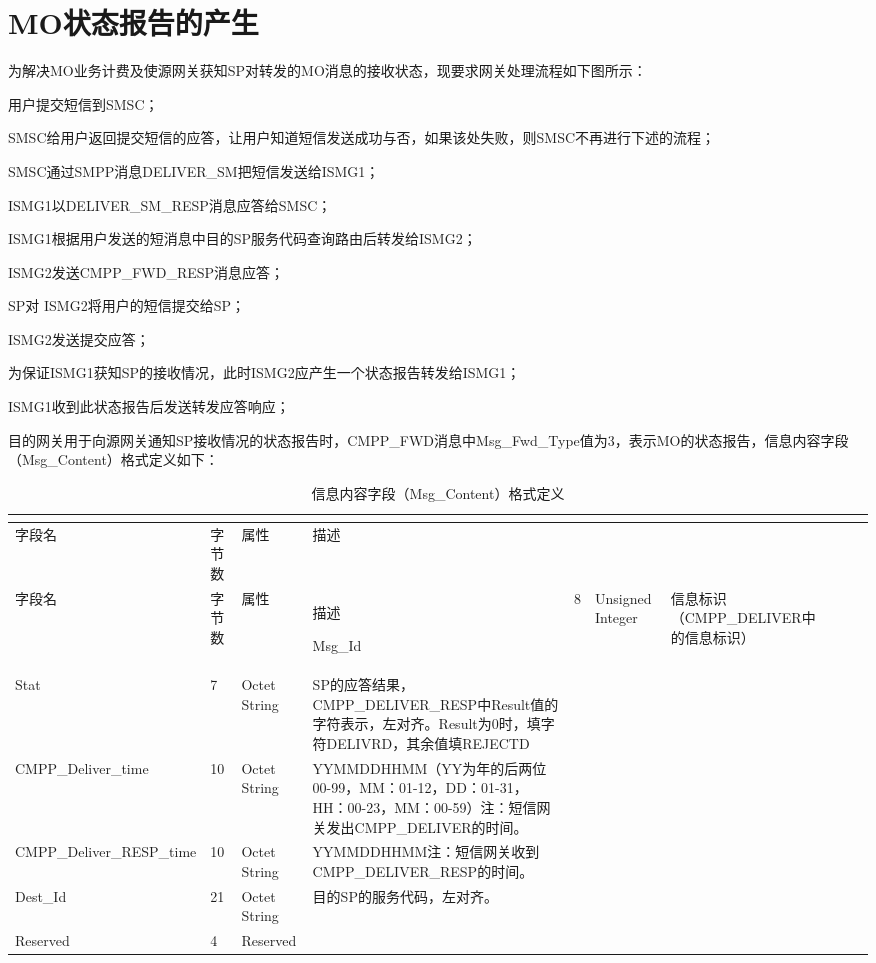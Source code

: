 \documentclass[11pt]{book} %
\begin{document}
\section{MO状态报告的产生}

为解决MO业务计费及使源网关获知SP对转发的MO消息的接收状态，现要求网关处理流程如下图所示：





\begin{compactenum}
\item 用户提交短信到SMSC；
\item SMSC给用户返回提交短信的应答，让用户知道短信发送成功与否，如果该处失败，则SMSC不再进行下述的流程；
\item SMSC通过SMPP消息DELIVER\_SM把短信发送给ISMG1；
\item ISMG1以DELIVER\_SM\_RESP消息应答给SMSC；
\item ISMG1根据用户发送的短消息中目的SP服务代码查询路由后转发给ISMG2；
\item ISMG2发送CMPP\_FWD\_RESP消息应答；
\item SP对 ISMG2将用户的短信提交给SP；
\item ISMG2发送提交应答；
\item 为保证ISMG1获知SP的接收情况，此时ISMG2应产生一个状态报告转发给ISMG1；
\item ISMG1收到此状态报告后发送转发应答响应；
\end{compactenum}

目的网关用于向源网关通知SP接收情况的状态报告时，CMPP\_FWD消息中Msg\_Fwd\_Type值为3，表示MO的状态报告，信息内容字段（Msg\_Content）格式定义如下：



\begin{longtable}{|m{90pt}|m{35pt}|m{80pt}|m{200pt}|}
\tabularnewline\hline
字段名&字节数&属性&描述
\endhead

\caption{信息内容字段（Msg\_Content）格式定义}\\
\hline
字段名&字节数&属性&描述
\endfirsthead

\endfoot

\endlastfoot

\hline
Msg\_Id&8&Unsigned Integer&信息标识（CMPP\_DELIVER中的信息标识）\\
\hline
Stat&7&Octet String&SP的应答结果，CMPP\_DELIVER\_RESP中Result值的字符表示，左对齐。Result为0时，填字符DELIVRD，其余值填REJECTD\\
\hline
CMPP\_Deliver\_time&10&Octet String&YYMMDDHHMM（YY为年的后两位00-99，MM：01-12，DD：01-31，HH：00-23，MM：00-59）\newline 注：短信网关发出CMPP\_DELIVER的时间。\\
\hline
CMPP\_Deliver\_RESP\_time&10&Octet String&YYMMDDHHMM\newline 注：短信网关收到CMPP\_DELIVER\_RESP的时间。\\
\hline
Dest\_Id&21&Octet String&目的SP的服务代码，左对齐。\\
\hline
Reserved&4&Reserved& \\
\hline
\end{longtable}
\end{document}
